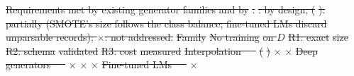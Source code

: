 \documentclass[conference]{IEEEtran}
\newcommand{\system}{\textsc{Synthagent}\xspace}
\providecommand{\DIFdeltex}[1]{{\protect\color{red}\sout{#1}}}                      %
\providecommand{\DIFdelFL}[1]{\DIFdel{#1}} %
\providecommand{\DIFdel}[1]{\texorpdfstring{\DIFdeltex{#1}}{}} %
\begin{document}
{%
\DIFdelFL{Requirements met by existing generator families and by }%
\DIFdelFL{. }%
\DIFdelFL{: by design; (}%
\DIFdelFL{): partially (SMOTE's size follows the class balance; fine-tuned LMs discard unparsable records); $\times$: not addressed.}}
\DIFdelFL{Family }%
\DIFdelFL{No training}%
\DIFdelFL{on $D$}%
\DIFdelFL{R1: exact}%
\DIFdelFL{size}%
\DIFdelFL{R2: schema}%
\DIFdelFL{validated}%
\DIFdelFL{R3: cost}%
\DIFdelFL{measured}%
\DIFdelFL{Interpolation~\mbox{%
\cite{chawla2002smote} }\hskip0pt%
}%
\DIFdelFL{(}%
\DIFdelFL{) }%
\DIFdelFL{$\times$ }%
\DIFdelFL{$\times$ }%
\DIFdelFL{Deep generators~\mbox{%
\cite{xu2019ctgan,kotelnikov2023tabddpm,zhang2024tabsyn} }\hskip0pt%
}%
\DIFdelFL{$\times$ }%
\DIFdelFL{$\times$ }%
\DIFdelFL{$\times$ }%
\DIFdelFL{Fine-tuned LMs~\mbox{%
\cite{borisov2023great,solatorio2023realtabformer} }\hskip0pt%
}%
\DIFdelFL{$\times$ }%
\end{document}
